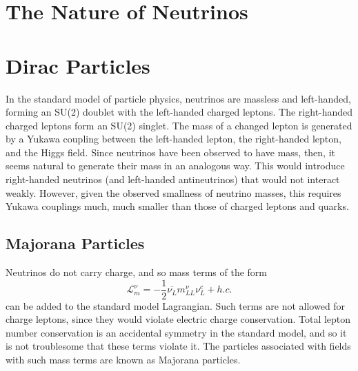 \documentclass[herrin-thesis.tex]{subfiles}
\begin{document}
\section{The Nature of Neutrinos}
\section{Dirac Particles}
In the standard model of particle physics, neutrinos are massless and left-handed, forming an SU(2) doublet with the left-handed charged leptons. The right-handed charged leptons form an SU(2) singlet. The mass of a changed lepton is generated by a Yukawa coupling between the left-handed lepton, the right-handed lepton, and the Higgs field. Since neutrinos have been observed to have mass, then, it seems natural to generate their mass in an analogous way. This would introduce right-handed neutrinos (and left-handed antineutrinos) that would not interact weakly. However, given the observed smallness of neutrino masses, this requires Yukawa couplings much, much smaller than those of charged leptons and quarks.

\subsection{Majorana Particles}
Neutrinos do not carry charge, and so mass terms of the form
\begin{equation}
\mathcal{L}_{m}^{\nu} = -\frac{1}{2}\overline{\nu_{L}} m_{L L}^{\nu} \nu_{L}^{c} +h.c.
\label{eq:nu_majorana_lagrangian}
\end{equation}
can be added to the standard model Lagrangian. Such terms are not allowed for charge leptons, since they would violate electric charge conservation. Total lepton number conservation is an accidental symmetry in the standard model, and so it is not troublesome that these terms violate it. The particles associated with fields with such mass terms are known as Majorana particles.
\end{document}
